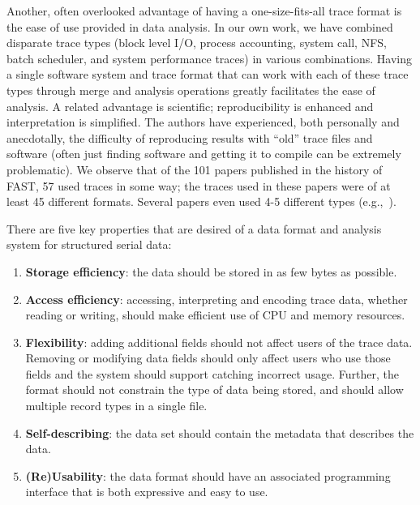 \documentclass{acm_proc_article-sp}
\begin{document}
Another, often overlooked advantage of having a one-size-fits-all
trace format is the ease of use provided in data analysis. In our own
work, we have combined disparate trace types (block level I/O, process
accounting, system call, NFS, batch scheduler, and system performance
traces) in various combinations. Having a single software system and
trace format that can work with each of these trace types through
merge and analysis operations greatly facilitates the ease of
analysis. A related advantage is scientific; reproducibility is
enhanced and interpretation is simplified.  The authors have
experienced, both personally and anecdotally, the difficulty of
reproducing results with ``old'' trace files and software (often just
finding software and getting it to compile can be extremely
problematic). We observe that of the 101 papers published in the
history of FAST, 57 used traces in some way; the traces used in these
papers were of at least 45 different formats.  Several papers even
used 4-5 different types (e.g.,~\cite{arc03, ellard03}).

There are five key properties that are desired of a data format
and analysis system for structured serial data:

\begin{enumerate}

\item \textbf{Storage efficiency}: the data should be stored in as few
bytes as possible.

\item \textbf{Access efficiency}: accessing, interpreting and encoding
trace data, whether reading or writing, should make efficient use of
CPU and memory resources.

\item \textbf{Flexibility}: adding additional fields should not affect
users of the trace data.  Removing or modifying data fields should
only affect users who use those fields and the system should support
catching incorrect usage.  Further, the format should not constrain
the type of data being stored, and should allow multiple record types
in a single file.

\item \textbf{Self-describing}: the data set should contain the
metadata that describes the data.

\item \textbf{(Re)Usability}: the data format should have an associated
programming interface that is both expressive and easy to use.

\end{enumerate}
\end{document}
